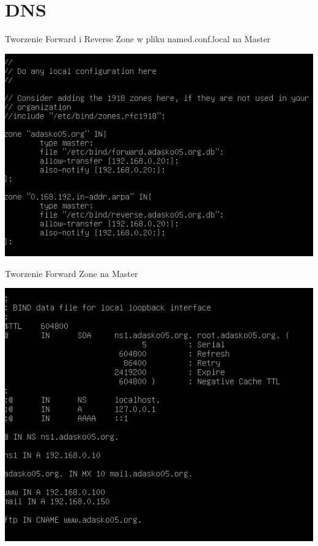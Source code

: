 \documentclass[presentation]{beamer}
\begin{document}
\section{DNS}
\label{sec:org94e1a56}
\begin{frame}[label={sec:org746ea97}]{Tworzenie Forward i Reverse Zone w pliku named.conf.local na Master}
\begin{center}
\includegraphics[width=.9\linewidth]{./data/dns/1.png}
\end{center}
\end{frame}
\begin{frame}[label={sec:org768a147}]{Tworzenie Forward Zone na Master}
\begin{center}
\includegraphics[width=.9\linewidth]{./data/dns/2.png}
\end{center}
\end{frame}
\end{document}
